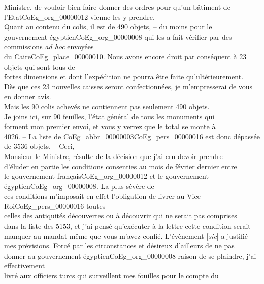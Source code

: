 \documentclass{book}
\begin{document}
Ministre, de vouloir bien faire donner des ordres pour qu’un bâtiment de\\
l’Etat\gls{CoEg_org_00000012} vienne les y prendre.\\
\indent Quant au contenu du colis, il est de 490 objets, – du moins pour le\\
gouvernement égyptien\gls{CoEg_org_00000008} qui les a fait vérifier par des commissions \textit{ad hoc} envoyées\\
du Caire\gls{CoEg_place_00000010}. Nous avons encore droit par conséquent à 23 objets qui sont tous de\\
fortes dimensions et dont l’expédition ne pourra être faite qu’ultérieurement.\\
Dès que ces 23 nouvelles caisses seront confectionnées, je m’empresserai de vous\\
en donner avis.\\
\indent Mais les 90 colis achevés ne contiennent pas seulement 490 objets.\\
Je joins ici, sur 90 feuilles, l’état général de tous les monuments qui\\
forment mon premier envoi, et vous y verrez que le total se monte à\\
4026. – La liste de \gls{CoEg_abbr_00000003}\gls{CoEg_pers_00000016} est donc dépassée de 3536 objets. – Ceci,\\
Monsieur le Ministre, résulte de la décision que j’ai cru devoir prendre\\
d’éluder en partie les conditions consenties au mois de février dernier entre\\
le gouvernement français\gls{CoEg_org_00000012} et le gouvernement égyptien\gls{CoEg_org_00000008}. La plus sévère de\\
ces conditions m’imposait en effet l’obligation de livrer au Vice-Roi\gls{CoEg_pers_00000016} toutes\\
celles des antiquités découvertes ou à découvrir qui ne serait pas comprises\\
dans la liste des 5153, et j’ai pensé qu’exécuter à la lettre cette condition serait\\
manquer au mandat même que vous m’avez confié. L’évènement {[\textit{sic}]} a justifié\\
mes prévisions. Forcé par les circonstances et désireux d’ailleurs de ne pas\\
donner au gouvernement égyptien\gls{CoEg_org_00000008} raison de se plaindre, j’ai effectivement\\
livré aux officiers turcs qui surveillent mes fouilles pour le compte du\\
\end{document}
